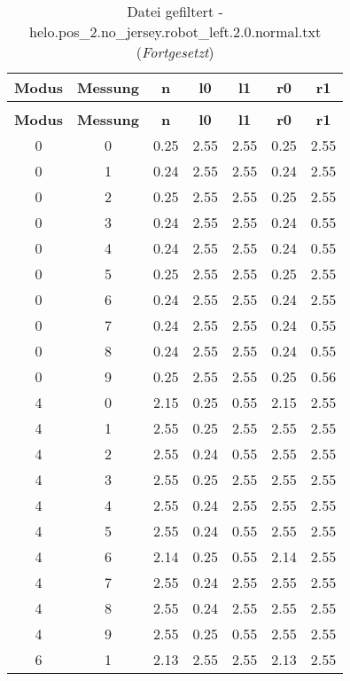 \begin{longtable}{|c|c||c||c|c||c|c|}
	\caption{Datei gefiltert - helo.pos\_2.no\_jersey.robot\_left.2.0.normal.txt} \label{tab:helo.pos-2.no-jersey.robot-left.2.0.normal.txt} \\ \hline
	\textbf{Modus} & \textbf{Messung} & \textbf{n} & \textbf{l0} & \textbf{l1} & \textbf{r0} & \textbf{r1}\\ \hline
	\endfirsthead
	\caption[]{Datei gefiltert - helo.pos\_2.no\_jersey.robot\_left.2.0.normal.txt (\emph{Fortgesetzt})} \\ \hline
	\textbf{Modus} & \textbf{Messung} & \textbf{n} & \textbf{l0} & \textbf{l1} & \textbf{r0} & \textbf{r1}\\ \hline
	\endhead
	0 & 0 & 0.25 & 2.55 & 2.55 & 0.25 & 2.55 \\ \hline
	0 & 1 & 0.24 & 2.55 & 2.55 & 0.24 & 2.55 \\ \hline
	0 & 2 & 0.25 & 2.55 & 2.55 & 0.25 & 2.55 \\ \hline
	0 & 3 & 0.24 & 2.55 & 2.55 & 0.24 & 0.55 \\ \hline
	0 & 4 & 0.24 & 2.55 & 2.55 & 0.24 & 0.55 \\ \hline
	0 & 5 & 0.25 & 2.55 & 2.55 & 0.25 & 2.55 \\ \hline
	0 & 6 & 0.24 & 2.55 & 2.55 & 0.24 & 2.55 \\ \hline
	0 & 7 & 0.24 & 2.55 & 2.55 & 0.24 & 0.55 \\ \hline
	0 & 8 & 0.24 & 2.55 & 2.55 & 0.24 & 0.55 \\ \hline
	0 & 9 & 0.25 & 2.55 & 2.55 & 0.25 & 0.56 \\ \hline
	4 & 0 & 2.15 & 0.25 & 0.55 & 2.15 & 2.55 \\ \hline
	4 & 1 & 2.55 & 0.25 & 2.55 & 2.55 & 2.55 \\ \hline
	4 & 2 & 2.55 & 0.24 & 0.55 & 2.55 & 2.55 \\ \hline
	4 & 3 & 2.55 & 0.25 & 2.55 & 2.55 & 2.55 \\ \hline
	4 & 4 & 2.55 & 0.24 & 2.55 & 2.55 & 2.55 \\ \hline
	4 & 5 & 2.55 & 0.24 & 0.55 & 2.55 & 2.55 \\ \hline
	4 & 6 & 2.14 & 0.25 & 0.55 & 2.14 & 2.55 \\ \hline
	4 & 7 & 2.55 & 0.24 & 2.55 & 2.55 & 2.55 \\ \hline
	4 & 8 & 2.55 & 0.24 & 2.55 & 2.55 & 2.55 \\ \hline
	4 & 9 & 2.55 & 0.25 & 0.55 & 2.55 & 2.55 \\ \hline
	6 & 1 & 2.13 & 2.55 & 2.55 & 2.13 & 2.55 \\ \hline

\end{longtable}
